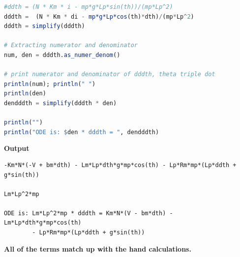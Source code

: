 \begin{lstlisting}[language=Julia,style=mystyle]
#ddth = (N * Km * i - mp*g*Lp*sin(th))/(mp*Lp^2)
dddth =  (N * Km * di - mp*g*Lp*cos(th)*dth)/(mp*Lp^2)
dddth = simplify(dddth) 

# Extracting numerator and denominator
num, den = dddth.as_numer_denom()

# print numerator and denominator of dddth, theta triple dot
println(num); println(" ")
println(den)
dendddth = simplify(dddth * den)

println("")
println("ODE is: $den * dddth = ", dendddth)
\end{lstlisting}
\textbf{Output} 
\begin{verbatim}
-Km*N*(-V + bm*dth) - Lm*Lp*dth*g*mp*cos(th) - Lp*Rm*mp*(Lp*ddth + g*sin(th))
 
Lm*Lp^2*mp

ODE is: Lm*Lp^2*mp * dddth = Km*N*(V - bm*dth) - Lm*Lp*dth*g*mp*cos(th) 
        - Lp*Rm*mp*(Lp*ddth + g*sin(th))
\end{verbatim}
\textbf{All of the terms match up with the hand calculations.}
\Qed
\bigskip






